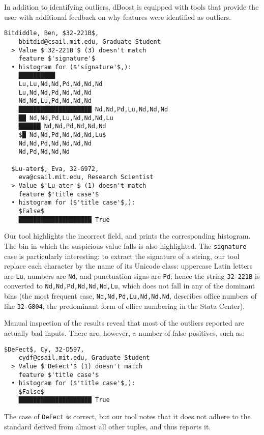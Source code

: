 % 


In addition to identifying outliers, dBoost is equipped with tools that provide the user with additional feedback on why features were identified as outliers.  

\begin{lstlisting}[gobble=2]
  Bitdiddle, Ben, $32-221B$, 
    bbitdid@csail.mit.edu, Graduate Student
  > Value $'32-221B'$ (3) doesn't match 
    feature $'signature'$
  • histogram for ($'signature'$,):
    ██████████ 
    Lu,Lu,Nd,Nd,Pd,Nd,Nd,Nd
    Lu,Nd,Nd,Pd,Nd,Nd,Nd
    Nd,Nd,Lu,Pd,Nd,Nd,Nd
    ████████████████████ Nd,Nd,Pd,Lu,Nd,Nd,Nd
    ██ Nd,Nd,Pd,Lu,Nd,Nd,Nd,Lu
    ██████ Nd,Nd,Pd,Nd,Nd,Nd
    $█ Nd,Nd,Pd,Nd,Nd,Nd,Lu$
    Nd,Nd,Pd,Nd,Nd,Nd,Nd
    Nd,Pd,Nd,Nd,Nd

  $Lu-ater$, Eva, 32-G972, 
    eva@csail.mit.edu, Research Scientist
  > Value $'Lu-ater'$ (1) doesn't match 
    feature $'title case'$  
  • histogram for ($'title case'$,):
    $False$
    ████████████████████ True
\end{lstlisting}

Our tool highlights the incorrect field, and prints the corresponding histogram. The bin in which the suspicious value falls is also highlighted. The \lstinline{signature} case is particularly interesting: to extract the signature of a string, our tool replace each character by the name of its Unicode class: uppercase Latin letters are \lstinline{Lu}, numbers are \lstinline{Nd}, and punctuation signs are \lstinline{Pd}; hence the string \lstinline{32-221B} is converted to \lstinline{Nd,Nd,Pd,Nd,Nd,Nd,Lu}, which does not fall in any of the dominant bins (the most frequent case, \lstinline{Nd,Nd,Pd,Lu,Nd,Nd,Nd}, describes office numbers of like \lstinline{32-G804}, the predominant form of office numbering in the Stata Center).

Manual inspection of the results reveal that most of the outliers reported are actually bad inputs. There are, however, a number of false positives, such as:

\begin{lstlisting}[gobble=2]
  $DeFect$, Cy, 32-D597, 
    cydf@csail.mit.edu, Graduate Student    
  > Value $'DeFect'$ (1) doesn't match 
    feature $'title case'$  
  • histogram for ($'title case'$,):
    $False$
    ████████████████████ True
\end{lstlisting}

The case of \lstinline{DeFect} is correct, but our tool notes that it does not adhere to the standard derived from almost all other tuples, and thus reports it. 
